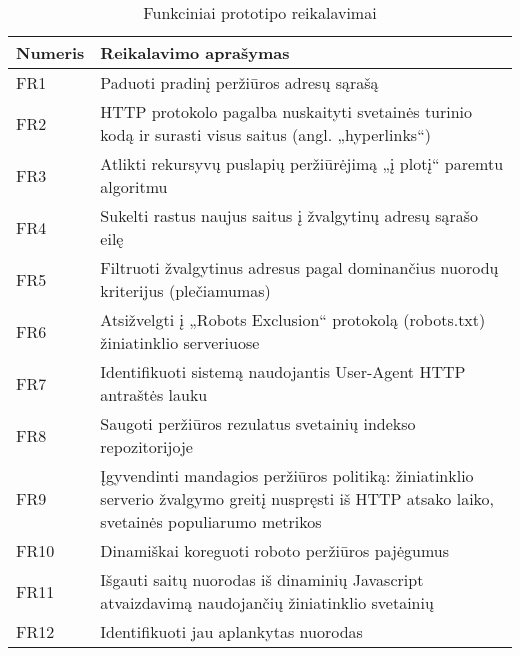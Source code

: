 \begin{table}[htbp]
  \centering
  \caption{Funkciniai prototipo reikalavimai}
    \begin{tabular}{|l|p{23.785em}|}
    \hline
    \textbf{Numeris} & \multicolumn{1}{l|}{\textbf{Reikalavimo aprašymas}} \bigstrut\\
    \hline
    FR1   & Paduoti pradinį peržiūros adresų sąrašą \bigstrut\\
    \hline
    FR2   & HTTP protokolo pagalba nuskaityti svetainės turinio kodą ir surasti visus saitus (angl. „hyperlinks“) \bigstrut\\
    \hline
    FR3   & Atlikti rekursyvų puslapių peržiūrėjimą „į plotį“ paremtu algoritmu \bigstrut\\
    \hline
    FR4   & Sukelti rastus naujus saitus į žvalgytinų adresų sąrašo eilę \bigstrut\\
    \hline
    FR5   & Filtruoti žvalgytinus adresus pagal dominančius nuorodų kriterijus (plečiamumas) \bigstrut\\
    \hline
    FR6   & Atsižvelgti į „Robots Exclusion“ protokolą (robots.txt) žiniatinklio serveriuose \bigstrut\\
    \hline
    FR7   & Identifikuoti sistemą naudojantis User-Agent HTTP antraštės lauku \bigstrut\\
    \hline
    FR8   & Saugoti peržiūros rezulatus svetainių indekso repozitorijoje \bigstrut\\
    \hline
    FR9   & Įgyvendinti mandagios peržiūros politiką: žiniatinklio serverio žvalgymo greitį nuspręsti iš HTTP atsako laiko, svetainės populiarumo metrikos \bigstrut\\
    \hline
    FR10   & Dinamiškai koreguoti roboto peržiūros pajėgumus \bigstrut\\
    \hline
    FR11  & Išgauti saitų nuorodas iš dinaminių Javascript atvaizdavimą naudojančių žiniatinklio svetainių \bigstrut\\
    \hline
    FR12  & Identifikuoti jau aplankytas nuorodas \bigstrut\\
    \hline
    \end{tabular}%
  \label{tab:functional_requirements}%
\end{table}%
